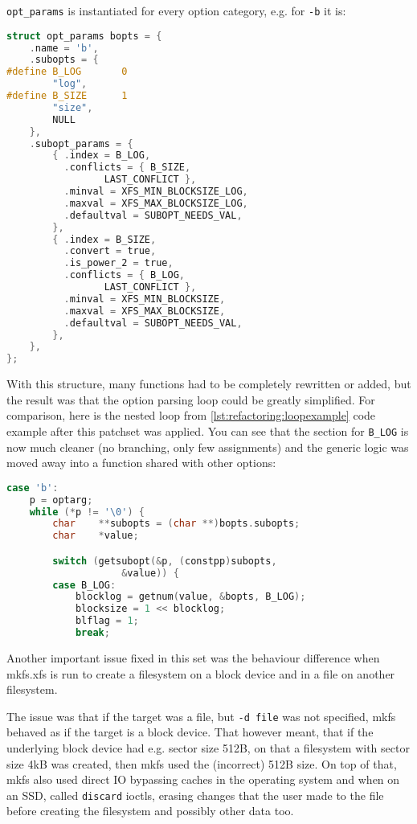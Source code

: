 {\tt opt\_params} is instantiated for every option category, e.g. for {\tt -b} it is:

\begin{lstlisting}[frame=none, basicstyle=\footnotesize\ttfamily,
language=C, numbers=none, numberstyle=\tiny\color{black},
caption= {Instantiation of the table for block options.}]
struct opt_params bopts = {
	.name = 'b',
	.subopts = {
#define	B_LOG		0
		"log",
#define	B_SIZE		1
		"size",
		NULL
	},
	.subopt_params = {
		{ .index = B_LOG,
		  .conflicts = { B_SIZE,
				 LAST_CONFLICT },
		  .minval = XFS_MIN_BLOCKSIZE_LOG,
		  .maxval = XFS_MAX_BLOCKSIZE_LOG,
		  .defaultval = SUBOPT_NEEDS_VAL,
		},
		{ .index = B_SIZE,
		  .convert = true,
		  .is_power_2 = true,
		  .conflicts = { B_LOG,
				 LAST_CONFLICT },
		  .minval = XFS_MIN_BLOCKSIZE,
		  .maxval = XFS_MAX_BLOCKSIZE,
		  .defaultval = SUBOPT_NEEDS_VAL,
		},
	},
};
\end{lstlisting}

With this structure, many functions had to be completely rewritten or
added, but the result was that the option parsing loop could be greatly
simplified. For comparison, here is the nested loop from
\ref{lst:refactoring:loopexample} code example after this patchset was
applied. You can see that the section for {\tt B\_LOG} is now much cleaner
(no branching, only few assignments) and the generic logic was moved away
into a function shared with other options:

\begin{lstlisting}[frame=none, basicstyle=\footnotesize\ttfamily,
language=C, numbers=none, numberstyle=\tiny\color{black},
caption= {Part of option-parsing loop from mkfs.xfs after the first patch
set.}]
case 'b':
	p = optarg;
	while (*p != '\0') {
		char	**subopts = (char **)bopts.subopts;
		char	*value;

		switch (getsubopt(&p, (constpp)subopts,
					&value)) {
		case B_LOG:
			blocklog = getnum(value, &bopts, B_LOG);
			blocksize = 1 << blocklog;
			blflag = 1;
			break;
\end{lstlisting}

Another important issue fixed in this set was the behaviour difference when
mkfs.xfs is run to create a filesystem on a block device and in a file on
another filesystem.

The issue was that if the target was a file, but {\tt -d file} was not
specified, mkfs behaved as if the target is a block device. That however
meant, that if the underlying block device had e.g. sector size 512B, on
that a filesystem with sector size 4kB was created, then mkfs used the
(incorrect) 512B size. On top of that, mkfs also used direct IO bypassing
caches in the operating system and when on an SSD, called {\tt discard}
ioctls, erasing changes that the user made to the file before
creating the filesystem and possibly other data too.


